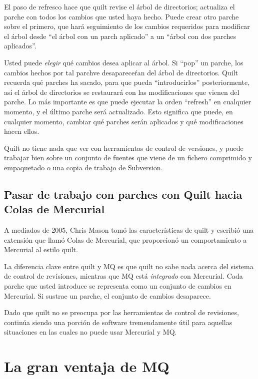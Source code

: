 El paso de refresco hace que quilt revise el árbol de directorios;
actualiza el parche con todos los cambios que usted haya hecho.  Puede
crear otro parche sobre el primero, que hará seguimiento de los
cambios requeridos para modificar el árbol desde ``el árbol con un
parch aplicado'' a un ``árbol con dos parches aplicados''.

Usted puede \emph{elegir} qué cambios desea aplicar al árbol.  Si
``pop'' un parche, los cambios hechos por tal parchve
desapareceŕan del árbol de directorios.  Quilt recuerda qué parches ha
sacado, para que pueda ``introducirlos'' posteriormente, así el
árbol de directorios se restaurará con las modificaciones que vienen
del parche.  Lo más importante es que puede ejecutar la orden
``refresh'' en cualquier momento, y el último parche será
actualizado.  Esto significa que puede, en cualquier momento, cambiar
qué parches serán aplicados y qué modificaciones hacen ellos.

Quilt no tiene nada que ver con herramientas de control de versiones,
y puede trabajar bien sobre un conjunto de fuentes que viene de un
fichero comprimido y empaquetado o una copia de trabajo de Subversion.

\subsection{Pasar de trabajo con parches con Quilt hacia Colas de Mercurial}
\label{sec:mq:quilt-mq}

A mediados de 2005, Chris Mason tomó las características de quilt y
escribió una extensión que llamó Colas de Mercurial, que proporcionó un comportamiento a Mercurial al estilo
quilt.

La diferencia clave entre quilt y MQ es que quilt no sabe nada acerca
del sistema de control de revisiones, mientras que MQ está
\emph{integrado} con Mercurial.  Cada parche que usted introduce se
representa como un conjunto de cambios en Mercurial.  Si sustrae un
parche, el conjunto de cambios desaparece.

Dado que quilt no se preocupa por las herramientas de control de
revisiones, continúa siendo una porción de software tremendamente útil
para aquellas situaciones en las cuales no puede usar Mercurial y MQ.

\section{La gran ventaja de MQ}


